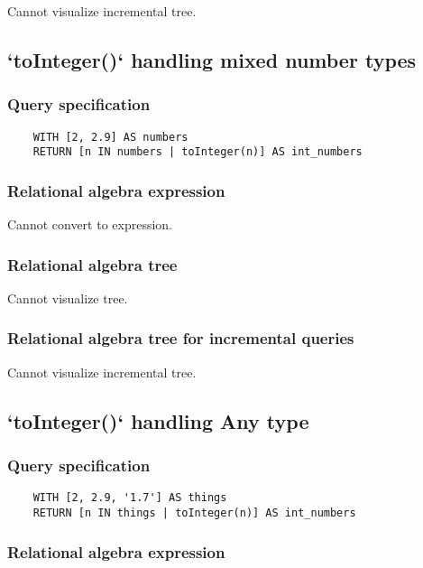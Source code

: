 	Cannot visualize incremental tree.
	\subsection{`toInteger()` handling mixed number types}

	\subsubsection*{Query specification}

	\begin{lstlisting}
	WITH [2, 2.9] AS numbers
	RETURN [n IN numbers | toInteger(n)] AS int_numbers
	\end{lstlisting}


	\subsubsection*{Relational algebra expression}

	Cannot convert to expression.

	\subsubsection*{Relational algebra tree}

	Cannot visualize tree.

	\subsubsection*{Relational algebra tree for incremental queries}

	Cannot visualize incremental tree.
	\subsection{`toInteger()` handling Any type}

	\subsubsection*{Query specification}

	\begin{lstlisting}
	WITH [2, 2.9, '1.7'] AS things
	RETURN [n IN things | toInteger(n)] AS int_numbers
	\end{lstlisting}


	\subsubsection*{Relational algebra expression}

